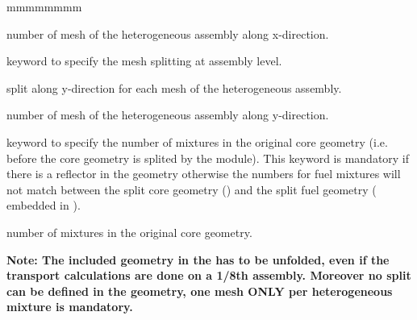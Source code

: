 \begin{ListeDeDescription}{mmmmmmmm}
\item[\dusa{nxass}] number of mesh of the heterogeneous assembly along x-direction. 

\item[\moc{SLPITY-ASS}] keyword to specify the mesh splitting at assembly level. 

\item[\dusa{ispy}] split along y-direction for each mesh of the heterogeneous assembly. 

\item[\dusa{nyass}] number of mesh of the heterogeneous assembly along y-direction. 

\item[\moc{MAX-MIX-GEO}] keyword to specify the number of mixtures in the original core geometry (i.e. before the core geometry is splited by the  module). This keyword is mandatory if there is a reflector in the geometry otherwise the numbers for fuel mixtures will not match between the split core geometry () and the split fuel geometry ( embedded in ).

\item[\dusa{nmxgeo}] number of mixtures in the original core geometry. 

\end{ListeDeDescription}

{\bf Note: The included geometry in the  has to be unfolded, even if the transport calculations are done on a 1/8th assembly. Moreover no split can be defined in the geometry, one mesh ONLY per heterogeneous mixture  is mandatory.} 

\eject
